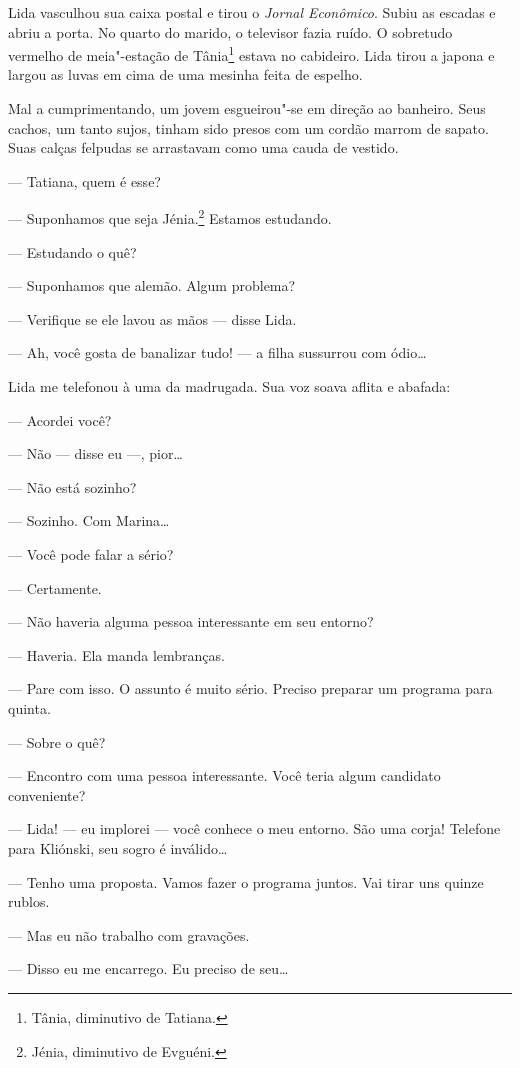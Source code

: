 Lida vasculhou sua caixa postal e tirou o \emph{Jornal Econômico}. Subiu
as escadas e abriu a porta. No quarto do marido, o televisor fazia
ruído. O sobretudo vermelho de meia"-estação de Tânia\footnote{Tânia,
  diminutivo de Tatiana.} estava no cabideiro. Lida tirou a japona e
largou as luvas em cima de uma mesinha feita de espelho.

Mal a cumprimentando, um jovem esgueirou"-se em direção ao banheiro. Seus
cachos, um tanto sujos, tinham sido presos com um cordão marrom de
sapato. Suas calças felpudas se arrastavam como uma cauda de vestido.

--- Tatiana, quem é esse?

--- Suponhamos que seja Jénia.\footnote{Jénia, diminutivo de Evguéni.}
Estamos estudando.

--- Estudando o quê?

--- Suponhamos que alemão. Algum problema?

--- Verifique se ele lavou as mãos --- disse Lida.

--- Ah, você gosta de banalizar tudo! --- a filha sussurrou com ódio\ldots{}

Lida me telefonou à uma da madrugada. Sua voz soava aflita e abafada:

--- Acordei você?

--- Não --- disse eu ---, pior\ldots{}

--- Não está sozinho?

--- Sozinho. Com Marina\ldots{}

--- Você pode falar a sério?

--- Certamente.

--- Não haveria alguma pessoa interessante em seu entorno?

--- Haveria. Ela manda lembranças.

--- Pare com isso. O assunto é muito sério. Preciso preparar um programa
para quinta.

--- Sobre o quê?

--- Encontro com uma pessoa interessante. Você teria algum candidato
conveniente?

--- Lida! --- eu implorei --- você conhece o meu entorno. São uma corja!
Telefone para Kliónski, seu sogro é inválido\ldots{}

--- Tenho uma proposta. Vamos fazer o programa juntos. Vai tirar uns
quinze rublos.

--- Mas eu não trabalho com gravações.

--- Disso eu me encarrego. Eu preciso de seu\ldots{}

